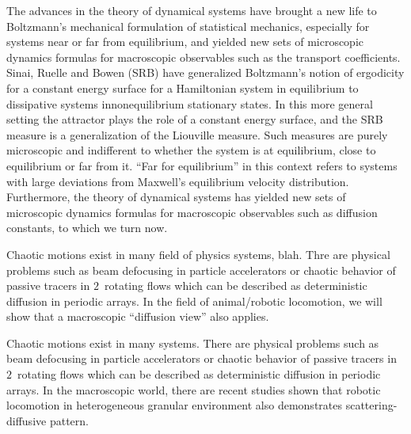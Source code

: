 


The advances in the theory of dynamical systems have brought a new life
to Boltzmann's mechanical formulation of statistical mechanics,
especially for systems near or far from equilibrium, and yielded new sets
of microscopic dynamics formulas for macroscopic observables such as the
transport coefficients. Sinai,
Ruelle and Bowen (SRB) have generalized Boltzmann's notion of ergodicity
for a constant energy surface for a Hamiltonian system in equilibrium to
dissipative systems in{nonequilibrium} stationary states. In this more
general setting the attractor plays the role of a constant energy
surface, and the SRB measure is a generalization of the Liouville
measure. Such measures are purely microscopic and indifferent to whether
the system is at equilibrium, close to equilibrium or far from it. ``Far
for equilibrium'' in this context refers to systems with large deviations
from Maxwell's equilibrium velocity distribution. Furthermore, the theory
of dynamical systems has yielded new sets of microscopic dynamics
formulas for macroscopic observables such as diffusion constants, to
which we turn now.
%
%


Chaotic motions exist in many field of physics systems, blah. Thre are
physical problems such as beam defocusing in particle accelerators or
chaotic behavior of passive tracers in $2$\dmn\ rotating flows which can
be described as deterministic diffusion in periodic arrays. In the field
of animal/robotic locomotion, we will show that a macroscopic ``diffusion
view'' also applies.

Chaotic motions exist in many systems. There are physical problems such
as beam defocusing in particle accelerators 
or chaotic behavior of passive tracers in $2$\dmn\ rotating
flows which can be described as deterministic
diffusion in periodic arrays. In the macroscopic world, there are recent
studies shown that robotic locomotion in heterogeneous granular
environment also demonstrates scattering-diffusive pattern.

